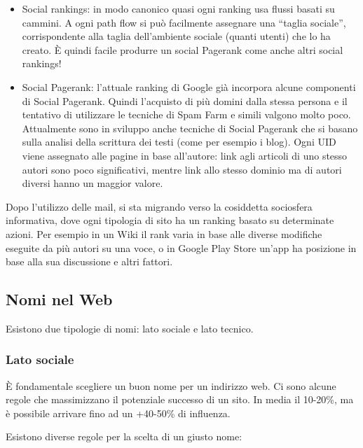 \begin{itemize}

\item Social rankings: in modo canonico quasi ogni ranking usa flussi basati su cammini. A ogni path flow si pu\`o facilmente assegnare una ``taglia sociale'', corrispondente alla taglia dell'ambiente sociale (quanti utenti) che lo ha creato. \`E quindi facile produrre un social Pagerank come anche altri social rankings!

\item Social Pagerank: l'attuale ranking di Google gi\`a incorpora alcune componenti di Social Pagerank. Quindi l'acquisto di pi\`u domini dalla stessa persona e il tentativo di utilizzare le tecniche di Spam Farm e simili valgono molto poco. Attualmente sono in sviluppo anche tecniche di Social Pagerank che si basano sulla analisi della scrittura dei testi (come per esempio i blog). Ogni UID viene assegnato alle pagine in base all'autore: link agli articoli di uno stesso autori sono poco significativi, mentre link allo stesso dominio ma di autori diversi hanno un maggior valore.

\end{itemize}

Dopo l'utilizzo delle mail, si sta migrando verso la cosiddetta sociosfera informativa, dove ogni tipologia di sito ha un ranking basato su determinate azioni. Per esempio in un Wiki il rank varia in base alle diverse modifiche eseguite da pi\`u autori su una voce, o in Google Play Store un'app ha posizione in base alla sua discussione e altri fattori.

\subsection{Nomi nel Web}

Esistono due tipologie di nomi: lato sociale e lato tecnico.

\subsubsection{Lato sociale}

\`E fondamentale scegliere un buon nome per un indirizzo web. Ci sono alcune regole che massimizzano il potenziale successo di un sito. In media il 10-20\%, ma \`e possibile arrivare fino ad un +40-50\% di influenza.

Esistono diverse regole per la scelta di un giusto nome:

